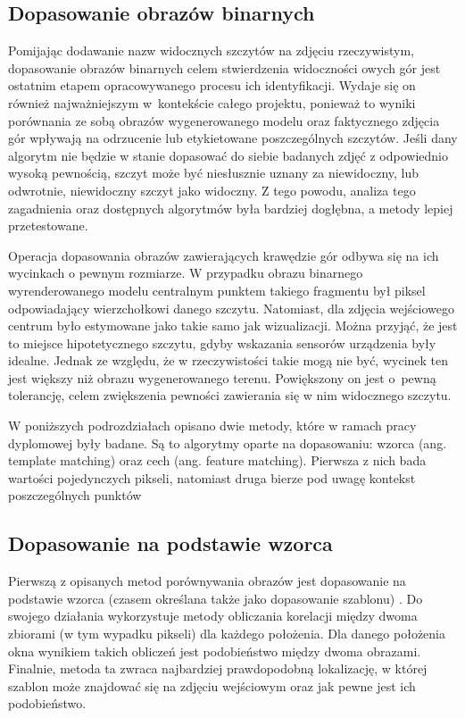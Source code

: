 \subsection{Dopasowanie obrazów binarnych} \label{sec:dopasowanie}

Pomijając dodawanie nazw widocznych szczytów na zdjęciu rzeczywistym, dopasowanie obrazów binarnych celem stwierdzenia widoczności owych gór jest ostatnim etapem opracowywanego procesu ich identyfikacji. Wydaje się on również najważniejszym w~kontekście całego projektu, ponieważ to wyniki porównania ze sobą obrazów wygenerowanego modelu oraz faktycznego zdjęcia gór wpływają na odrzucenie lub etykietowane poszczególnych szczytów. Jeśli dany algorytm nie będzie w stanie dopasować do siebie badanych zdjęć z odpowiednio wysoką pewnością, szczyt może być niesłusznie uznany za niewidoczny, lub odwrotnie, niewidoczny szczyt jako widoczny. Z tego powodu, analiza tego zagadnienia oraz dostępnych algorytmów była bardziej dogłębna, a metody lepiej przetestowane.  



Operacja dopasowania obrazów zawierających krawędzie gór odbywa się na ich wycinkach o pewnym rozmiarze. W przypadku obrazu binarnego wyrenderowanego modelu centralnym punktem takiego fragmentu był piksel odpowiadający wierzchołkowi danego szczytu. Natomiast, dla zdjęcia wejściowego centrum było estymowane jako takie samo jak wizualizacji. Można przyjąć, że jest to miejsce hipotetycznego szczytu, gdyby wskazania sensorów urządzenia były idealne. Jednak ze względu, że w rzeczywistości takie mogą nie być, wycinek ten jest większy niż obrazu wygenerowanego terenu. Powiększony on jest o~pewną tolerancję, celem zwiększenia pewności zawierania się w nim widocznego szczytu. 

W poniższych podrozdziałach opisano dwie metody, które w ramach pracy dyplomowej były badane. Są to algorytmy oparte na dopasowaniu: wzorca (ang. template matching) oraz cech (ang. feature matching). Pierwsza z nich bada wartości pojedynczych pikseli, natomiast druga bierze pod uwagę kontekst poszczególnych punktów


\subsection{Dopasowanie na podstawie wzorca} \label{sec:template_matching}

Pierwszą z opisanych metod porównywania obrazów jest dopasowanie na podstawie wzorca (czasem określana także jako dopasowanie szablonu) \cite{template_opencv_1,template_opencv_2,template_adaptive,template_british,template_vidhya}. Do swojego działania wykorzystuje metody obliczania korelacji między dwoma zbiorami (w tym wypadku pikseli) dla każdego położenia. Dla danego położenia okna wynikiem takich obliczeń jest podobieństwo między dwoma obrazami. Finalnie, metoda ta zwraca najbardziej prawdopodobną lokalizację, w której szablon może znajdować się na zdjęciu wejściowym oraz jak pewne jest ich podobieństwo.

